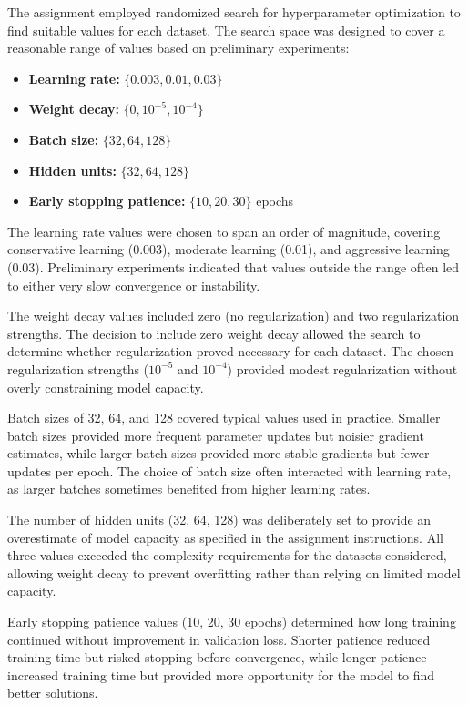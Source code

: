 \documentclass[conference]{IEEEtran}
\begin{document}
The assignment employed randomized search for hyperparameter optimization to find suitable values for each dataset. The search space was designed to cover a reasonable range of values based on preliminary experiments:

\begin{itemize}
\item \textbf{Learning rate:} $\{0.003, 0.01, 0.03\}$
\item \textbf{Weight decay:} $\{0, 10^{-5}, 10^{-4}\}$
\item \textbf{Batch size:} $\{32, 64, 128\}$
\item \textbf{Hidden units:} $\{32, 64, 128\}$
\item \textbf{Early stopping patience:} $\{10, 20, 30\}$ epochs
\end{itemize}

The learning rate values were chosen to span an order of magnitude, covering conservative learning (0.003), moderate learning (0.01), and aggressive learning (0.03). Preliminary experiments indicated that values outside the range often led to either very slow convergence or instability.

The weight decay values included zero (no regularization) and two regularization strengths. The decision to include zero weight decay allowed the search to determine whether regularization proved necessary for each dataset. The chosen regularization strengths ($10^{-5}$ and $10^{-4}$) provided modest regularization without overly constraining model capacity.

Batch sizes of 32, 64, and 128 covered typical values used in practice. Smaller batch sizes provided more frequent parameter updates but noisier gradient estimates, while larger batch sizes provided more stable gradients but fewer updates per epoch. The choice of batch size often interacted with learning rate, as larger batches sometimes benefited from higher learning rates.

The number of hidden units (32, 64, 128) was deliberately set to provide an overestimate of model capacity as specified in the assignment instructions. All three values exceeded the complexity requirements for the datasets considered, allowing weight decay to prevent overfitting rather than relying on limited model capacity.

Early stopping patience values (10, 20, 30 epochs) determined how long training continued without improvement in validation loss. Shorter patience reduced training time but risked stopping before convergence, while longer patience increased training time but provided more opportunity for the model to find better solutions.
\end{document}
